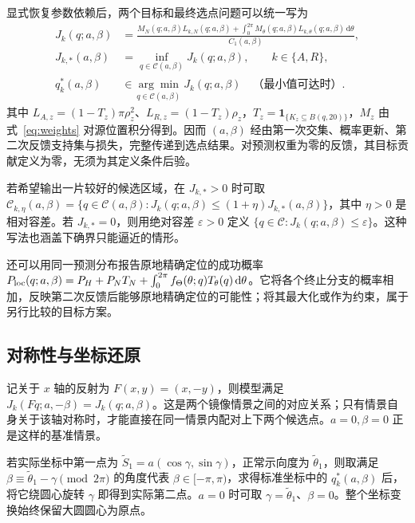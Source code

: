 \documentclass[UTF8,a4paper,zihao=-4,fontset=none]{ctexart}
\numberwithin{equation}{section}
\newcommand{\ind}{\mathbf 1}
\newcommand{\dd}{\,\mathrm d}
\begin{document}
显式恢复参数依赖后，两个目标和最终选点问题可以统一写为
\begin{equation}\label{eq:optimization}
\begin{aligned}
J_k(q;a,\beta)
&=\frac{M_N(q;a,\beta)L_{k,N}(q;a,\beta)
+\displaystyle\int_0^{2\pi}M_\theta(q;a,\beta)L_{k,\theta}(q;a,\beta)\dd\theta}{C_1(a,\beta)},\\
J_{k,*}(a,\beta)&=\inf_{q\in\mathcal C(a,\beta)}J_k(q;a,\beta),\qquad k\in\{A,R\},\\
q_k^*(a,\beta)&\in\underset{q\in\mathcal C(a,\beta)}{\arg\min}\,J_k(q;a,\beta)
\quad\text{（最小值可达时）}.
\end{aligned}
\end{equation}
其中 \(L_{A,z}=(1-T_z)\pi\rho_z^2\)、\(L_{R,z}=(1-T_z)\rho_z\)，\(T_z=\ind_{\{K_z\subseteq B(q,20)\}}\)，\(M_z\) 由式~\eqref{eq:weights} 对源位置积分得到。因而 \((a,\beta)\) 经由第一次交集、概率更新、第二次反馈支持集与损失，完整传递到选点结果。对预测权重为零的反馈，其目标贡献定义为零，无须为其定义条件后验。

若希望输出一片较好的候选区域，在 \(J_{k,*}>0\) 时可取 \(\mathcal C_{k,\eta}(a,\beta)=\{q\in\mathcal C(a,\beta):J_k(q;a,\beta)\le(1+\eta)J_{k,*}(a,\beta)\}\)，其中 \(\eta>0\) 是相对容差。若 \(J_{k,*}=0\)，则用绝对容差 \(\varepsilon>0\) 定义 \(\{q\in\mathcal C:J_k(q;a,\beta)\le\varepsilon\}\)。这种写法也涵盖下确界只能逼近的情形。

还可以用同一预测分布报告原地精确定位的成功概率 \(P_{\rm loc}(q;a,\beta)=P_H+P_NT_N+\int_0^{2\pi}f_\Theta(\theta;q)T_\theta(q)\dd\theta\)。它将各个终止分支的概率相加，反映第二次反馈后能够原地精确定位的可能性；将其最大化或作为约束，属于另行比较的目标方案。

\subsection{对称性与坐标还原}
记关于 \(x\) 轴的反射为 \(F(x,y)=(x,-y)\)，则模型满足 \(J_k(Fq;a,-\beta)=J_k(q;a,\beta)\)。这是两个镜像情景之间的对应关系；只有情景自身关于该轴对称时，才能直接在同一情景内配对上下两个候选点。\(a=0,\beta=0\) 正是这样的基准情景。

若实际坐标中第一点为 \(\widetilde S_1=a(\cos\gamma,\sin\gamma)\)，正常示向度为 \(\widetilde\theta_1\)，则取满足 \(\beta\equiv\widetilde\theta_1-\gamma\pmod{2\pi}\) 的角度代表 \(\beta\in[-\pi,\pi)\)，求得标准坐标中的 \(q_k^*(a,\beta)\) 后，将它绕圆心旋转 \(\gamma\) 即得到实际第二点。\(a=0\) 时可取 \(\gamma=\widetilde\theta_1\)、\(\beta=0\)。整个坐标变换始终保留大圆圆心为原点。
\end{document}
